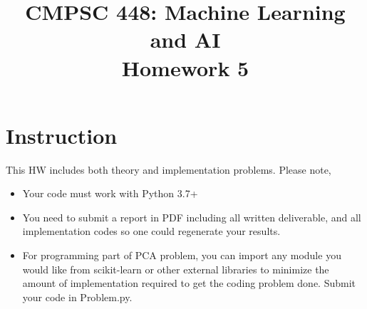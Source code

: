 \documentclass[12pt]{article}
\title{CMPSC 448: Machine Learning and AI \\ Homework 5}
\author{}
\date{}
\theoremstyle{quest}
\begin{document}
\maketitle

\section*{Instruction}
This HW includes both theory and implementation problems. Please note,
\begin{itemize}
    \item Your code must work with Python 3.7+
    \item You need to submit a report in PDF including all written deliverable, and all implementation codes so one could regenerate your results.
    \item For programming part of PCA problem, you can import any module you would like from \textsf{scikit-learn} or other external libraries to minimize the amount of implementation required to get the coding problem done. Submit your code in \textsf{Problem.py}.
\end{itemize}
\end{document}
